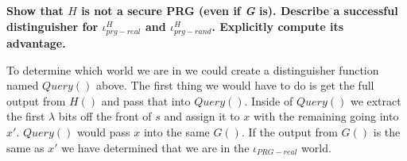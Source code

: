 \documentclass[letterpaper,12pt,notitlepage,fleqn]{article}
\begin{document}
\section{}
\textbf{Show that $H$ is \textbf{not} a secure PRG (even if \textit{G} is). Describe a successful distinguisher for $\iota^{H}_{prg-real}$ and $\iota^{H}_{prg-rand}$. Explicitly compute its advantage.}
\begin{center}
\begin{multicols}{2}
\columnbreak
\begin{flushright}

\end{flushright}
\end{multicols}


\end{center}
To determine which world we are in we could create a distinguisher function named $Query()$ above. The first thing we would have to do is get the full output from $H()$ and pass that into $Query()$. Inside of $Query()$ we extract the first $\lambda$ bits off the front of $s$ and assign it to $x$ with the remaining going into $x'$. $Query()$ would pass $x$ into the same $G()$. If the output from $G()$ is the same as $x'$ we have determined that we are in the $\iota_{PRG-real}$ world.
\end{document}
